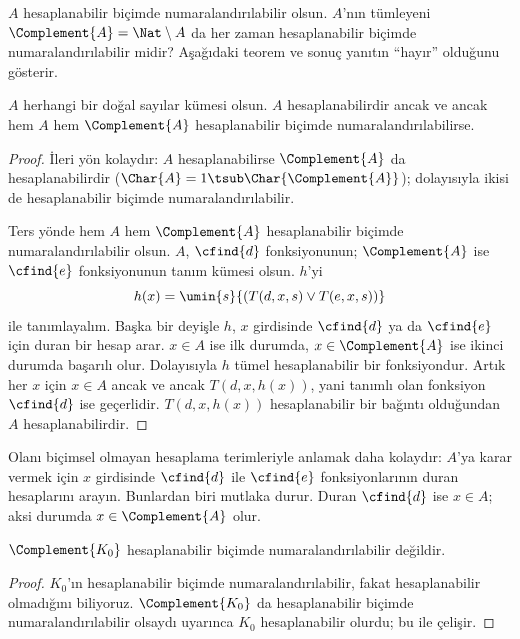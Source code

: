 


$A$ hesaplanabilir biçimde numaralandırılabilir olsun. $A$'nın tümleyeni
$\Complement{A}=\Nat\setminus A$ da her zaman hesaplanabilir biçimde
numaralandırılabilir midir? Aşağıdaki teorem ve sonuç yanıtın ``hayır''
olduğunu gösterir.

\begin{thm}
$A$ herhangi bir doğal sayılar kümesi olsun. $A$ hesaplanabilirdir ancak ve
ancak hem $A$ hem $\Complement{A}$ hesaplanabilir biçimde
numaralandırılabilirse.
\end{thm}

\begin{proof}
İleri yön kolaydır: $A$ hesaplanabilirse $\Complement{A}$ da
hesaplanabilirdir ($\Char{A}=1\tsub\Char{\Complement{A}}$); dolayısıyla ikisi
de hesaplanabilir biçimde numaralandırılabilir.

Ters yönde hem $A$ hem $\Complement{A}$ hesaplanabilir biçimde
numaralandırılabilir olsun. $A$, $\cfind{d}$ fonksiyonunun;
$\Complement{A}$ ise $\cfind{e}$ fonksiyonunun tanım kümesi olsun. $h$'yi
\[
  h(x)=\umin{s}{(T(d,x,s)\lor T(e,x,s))}
\]
ile tanımlayalım. Başka bir deyişle $h$, $x$ girdisinde $\cfind{d}$ ya da
$\cfind{e}$ için duran bir hesap arar. $x\in A$ ise ilk durumda,
$x\in\Complement{A}$ ise ikinci durumda başarılı olur. Dolayısıyla $h$ tümel
hesaplanabilir bir fonksiyondur. Artık her $x$ için $x\in A$ ancak ve ancak
$T(d,x,h(x))$, yani tanımlı olan fonksiyon $\cfind{d}$ ise geçerlidir.
$T(d,x,h(x))$ hesaplanabilir bir bağıntı olduğundan $A$ hesaplanabilirdir.
\end{proof}

\begin{explain}
Olanı biçimsel olmayan hesaplama terimleriyle anlamak daha kolaydır: $A$'ya
karar vermek için $x$ girdisinde $\cfind{d}$ ile $\cfind{e}$ fonksiyonlarının
duran hesaplarını arayın. Bunlardan biri mutlaka durur. Duran $\cfind{d}$ ise
$x\in A$; aksi durumda $x\in\Complement{A}$ olur.
\end{explain}

\begin{cor}
$\Complement{K_0}$ hesaplanabilir biçimde numaralandırılabilir değildir.
\end{cor}

\begin{proof}
$K_0$'ın hesaplanabilir biçimde numaralandırılabilir, fakat hesaplanabilir
olmadığını biliyoruz. $\Complement{K_0}$ da hesaplanabilir biçimde
numaralandırılabilir olsaydı  uyarınca $K_0$
hesaplanabilir olurdu; bu  ile çelişir.
\end{proof}

